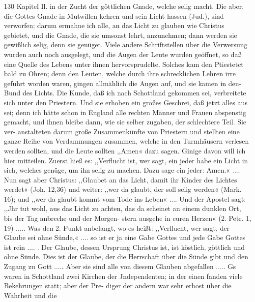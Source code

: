 130 Kapitel Il.
in der Zucht der göttlichen Gnade, welche selig macht. Die aber,
die Gottes Gnade in Mutwillen kehren und sein Licht hassen
(Jud.), sind verworfen; darum ermahne ich alle, an das Licht zu
glauben wie Christus gebietet, und die Gnade, die sie umsonst
lehrt, anzunehmen; dann werden sie gewißlich selig, denn sie
genüget. Viele andere Schriftstellen über die Verwersung wurden
auch noch ausgelegt, und die Augen der Leute wurden geöffnet,
so daß eine Quelle des Lebens unter ihnen hervorsprudelte.
Solches kam den Ptiestetct bald zu Ohren; denn den Leuten,
welche durch ihre schrecklichen Lehren irre geführt worden waren,
gingen allmählich die Augen auf, und sie kamen in den- Bund
des Lichts. Die Kunde, daß ich nach Schottland gekommen sei,
verbreitete sich unter den Priestern. Und sie erhoben ein großes
Geschrei, daß jetzt alles aus sei; denn ich hätte schon in England
alle rechten Männer und Frauen abspenstig gemacht, und ihnen
bleibe dann, wie sie selber zugaben, der schlechtere Teil. Sie ver-
anstalteten darum große Zusammenkünfte von Priestern und
stellten eine ganze Reihe von Verdammungen zusammen, welche
in den Turmhäusern verlesen werden sollten, und die Leute sollten
,,Amen« dazu sagen. Ginige davon will ich hier mitteilen. Zuerst
hieß es: ,,Verflucht ist, wer sagt, ein jeder habe ein Licht in sich,
welches genüge, um ihn selig zu machen. Dazu sage ein jeder:
Amen.« .... Nun sagt aber Christus: ,,Glaubet an das Licht,
damit ihr Kinder des Lichtes werdet« (Joh. 12,36) und weiter:
,,wer da glaubt, der soll selig werden« (Mark. 16); und ,,wer
da glaubt kommt vom Tode ins Leben« .... Und der Apostel
sagt: ,,Jhr tut wohl, aus das Licht zu achten, das da scheinet
an einem dunklen Ort, bis der Tag anbreche und der Morgen-
stern ausgehe in euren Herzen« (2. Petr. 1, 19) ..... Was
den 2. Punkt anbelangt, wo es heißt: ,,Verflucht, wer sagt, der
Glaube sei ohne Sünde,« .... so ist er ja eine Gabe Gottes
und jede Gabe Gottes ist rein .... . Der Glaube, dessen
Ursprung Christus ist, ist köstlich, göttlich und ohne Sünde. Dies
ist der Glaube, der die Herrschaft über die Sünde gibt und den
Zugang zu Gott ..... Aber sie sind alle von diesem Glauben
abgefallen .....
Gs waren in Schottland zwei Kirchen der Jndependenten;
in der einen fanden viele Bekehrungen statt; aber der Pre-
diger der andern war sehr erbost über die Wahrheit und die


